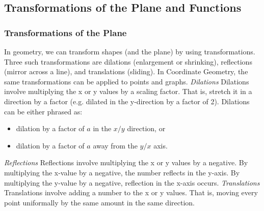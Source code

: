 \documentclass{article}
\begin{document}
		\subsection{Transformations of the Plane and Functions}
			\subsubsection{Transformations of the Plane}
				In geometry, we can transform shapes (and the plane) by using transformations. Three such transformations are dilations (enlargement or shrinking), reflections (mirror across a line), and translations (sliding). In Coordinate Geometry, the same transformations can be applied to points and graphs.
				\newline\newline
				\textit{Dilations}\newline
				Dilations involve multiplying the x or y values by a scaling factor. That is, stretch it in a direction by a factor (e.g. dilated in the y-direction by a factor of 2).
				\newline\newline
				Dilations can be either phrased as:
				\begin{itemize}
					\item dilation by a factor of $a$ in the $x/y$ direction, or
					\item dilation by a factor of $a$ away from the $y/x$ axis.
				\end{itemize}
				\textit{Reflections}\newline
				Reflections involve multiplying the x or y values by a negative. By multiplying the x-value by a negative, the number reflects in the y-axis. By multiplying the y-value by a negative, reflection in the x-axis occurs.
				\newline\newline
				\textit{Translations}
				Translations involve adding a number to the x or y values. That is, moving every point uniformally by the same amount in the same direction.
\end{document}
